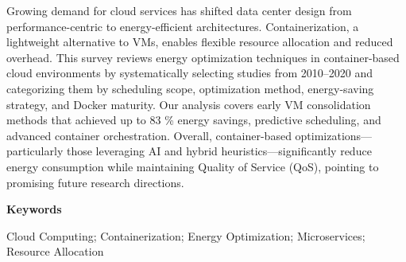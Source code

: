 Growing demand for cloud services has shifted data center design from performance-centric to energy-efficient architectures. Containerization, a lightweight alternative to VMs, enables flexible resource allocation and reduced overhead. This survey reviews energy optimization techniques in container-based cloud environments by systematically selecting studies from 2010–2020 and categorizing them by scheduling scope, optimization method, energy-saving strategy, and Docker maturity. Our analysis covers early VM consolidation methods that achieved up to 83 \% energy savings, predictive scheduling, and advanced container orchestration. Overall, container-based optimizations—particularly those leveraging AI and hybrid heuristics—significantly reduce energy consumption while maintaining Quality of Service (QoS), pointing to promising future research directions.

\textbf{Keywords} 

Cloud Computing; Containerization; Energy Optimization; Microservices; Resource Allocation
